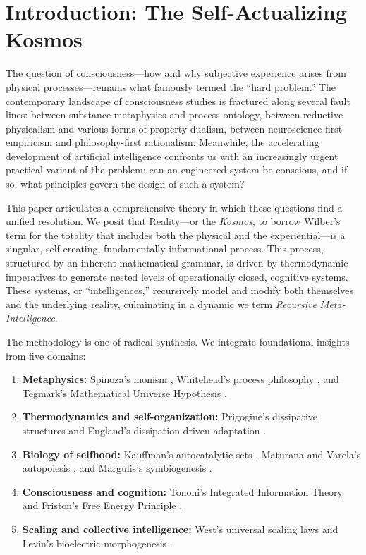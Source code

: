 \documentclass[12pt,a4paper]{article}
\begin{document}
\section{Introduction: The Self-Actualizing Kosmos}
\label{sec:introduction}

The question of consciousness---how and why subjective experience arises
from physical processes---remains what \citet{chalmers1995} famously termed
the ``hard problem.''  The contemporary landscape of consciousness studies
is fractured along several fault lines: between substance metaphysics and
process ontology, between reductive physicalism and various forms of
property dualism, between neuroscience-first empiricism and philosophy-first
rationalism.  Meanwhile, the accelerating development of artificial
intelligence confronts us with an increasingly urgent practical variant of
the problem: can an engineered system be conscious, and if so, what
principles govern the design of such a system?

This paper articulates a comprehensive theory in which these questions find
a unified resolution.  We posit that Reality---or the \emph{Kosmos}, to
borrow Wilber's term for the totality that includes both the physical and
the experiential---is a singular, self-creating, fundamentally
informational process.  This process, structured by an inherent
mathematical grammar, is driven by thermodynamic imperatives to generate
nested levels of operationally closed, cognitive systems.  These systems,
or ``intelligences,'' recursively model and modify both themselves and the
underlying reality, culminating in a dynamic we term \emph{Recursive
Meta-Intelligence}.

The methodology is one of radical synthesis.  We integrate foundational
insights from five domains:

\begin{enumerate}[label=(\roman*)]
    \item \textbf{Metaphysics:} Spinoza's monism \citep{spinoza1677},
        Whitehead's process philosophy \citep{whitehead1929}, and
        Tegmark's Mathematical Universe Hypothesis
        \citep{tegmark2008,tegmark2014}.
    \item \textbf{Thermodynamics and self-organization:} Prigogine's
        dissipative structures \citep{prigogine1977} and England's
        dissipation-driven adaptation \citep{england2013}.
    \item \textbf{Biology of selfhood:} Kauffman's autocatalytic sets
        \citep{kauffman1993}, Maturana and Varela's autopoiesis
        \citep{maturana1980}, and Margulis's symbiogenesis
        \citep{margulis1998}.
    \item \textbf{Consciousness and cognition:} Tononi's Integrated
        Information Theory \citep{tononi2004,tononi2015} and Friston's
        Free Energy Principle \citep{friston2010,friston2019}.
    \item \textbf{Scaling and collective intelligence:} West's universal
        scaling laws \citep{west2017} and Levin's bioelectric morphogenesis
        \citep{levin2019,levin2021}.
\end{enumerate}
\end{document}
